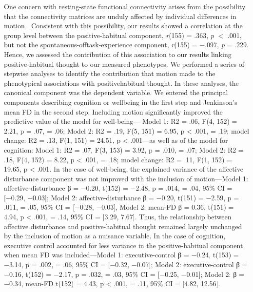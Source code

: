 One concern with resting-state functional connectivity arises from the possibility that the connectivity matrices are unduly affected by individual differences in motion \cite{Power2014}. Consistent with this possibility, our results showed a correlation at the group level between the positive-habitual component, \textit{r}(155) = .363, \textit{p} $<$ .001, but not the spontaneous-offtask-experience component, \textit{r}(155) = −.097, \textit{p} = .229. Hence, we assessed the contribution of this association to our results linking positive-habitual thought to our measured phenotypes. We performed a series of stepwise analyses to identify the contribution that motion made to the phenotypical associations with positivehabitual thought. In these analyses, the canonical component was the dependent variable. We entered the principal components describing cognition or wellbeing in the first step and Jenkinson’s mean FD in the second step. Including motion significantly improved the predictive value of the model for well-being— Model 1: R2 = .06, F(4, 152) = 2.21, p = .07, \paretasquared = .06; Model 2: R2 = .19, F(5, 151) = 6.95, p < .001, \paretasquared = .19; model change: R2 = .13, F(1, 151) = 24.51, p < .001—as well as of the model for cognition: Model 1: R2 = .07, F(3, 153) = 3.92, p = .010, \paretasquared = .07; Model 2: R2 = .18, F(4, 152) = 8.22, p < .001, \paretasquared = .18; model change: R2 = .11, F(1, 152) = 19.65, p < .001. In the case of well-being, the explained variance of the affective disturbance component was not improved with the inclusion of motion—Model 1: affective-disturbance β = −0.20, t(152) = −2.48, p = .014, \paretasquared = .04, 95\% CI = [−0.29, −0.03]; Model 2: affective-disturbance β = −0.20, t(151) = −2.59, p = .011, \paretasquared = .05, 95\% CI = [−0.28, −0.03], Model 2: mean-FD β = 0.36, t(151) = 4.94, p < .001, \paretasquared = .14, 95\% CI = [3.29, 7.67]. Thus, the relationship between affective disturbance and positive-habitual thought remained largely unchanged by the inclusion of motion as a nuisance variable. In the case of cognition, executive control accounted for less variance in the positive-habitual component when mean FD was included—Model 1: executive-control β = −0.24, t(153) = −3.14, p = .002, \paretasquared = .06, 95\% CI = [−0.32, −0.07]; Model 2: executive-control β = −0.16, t(152) = −2.17, p = .032, \paretasquared = .03, 95\% CI = [−0.25, −0.01]; Model 2: β = −0.34, mean-FD t(152) = 4.43, p < .001, \paretasquared = .11, 95\% CI = [4.82, 12.56].

